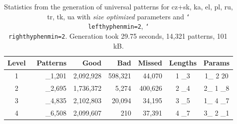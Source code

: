\documentclass{csbulletin}
\def\bs{\char`\\}
\begin{document}
\begin{table}[tbh]
\caption{Statistics from the generation of universal patterns for cz+sk, ka, el, pl, ru, tr, tk, ua with \emph{size optimized} parameters and 
\texttt{\bs lefthyphenmin=2}, \texttt{\bs righthyphenmin=2}.
Generation took 29.75 seconds, 14,321 patterns, 101\,kB.
}
\label{tab:unipatternssize}
\smallskip
\begin{tabular}{crrrrcc}
\toprule
Level& \ Patterns & Good &  Bad & Missed  & Lengths & Params\tabularnewline
\midrule
1 &	_1,201 & 2,092,928 &	598,321 &  44,070 &	 1 _3 &	1_ 2 20\tabularnewline
2 &	_2,695 &	1,736,372 &	  5,274 & 400,626 &	 2 _4 &	2_ 1 _8\tabularnewline
3 &	_4,835 &	2,102,803 &	 20,094 &  34,195 &	 3 _5 &	1_ 4 _7\tabularnewline
4 &	_6,508 &	2,099,607 &	    210 &  37,391 &	 4 _7 &	3_ 2 _1\tabularnewline
\bottomrule
\end{tabular}
\end{table}
\end{document}
